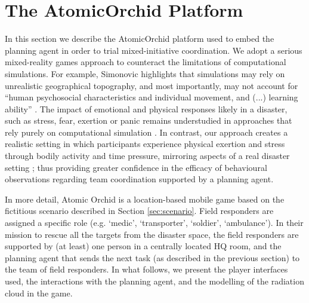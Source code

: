 \section{The A\lowercase{tomic}O\lowercase{rchid} Platform}\label{sec:atomicorchid}
\noindent In this section we describe the AtomicOrchid platform used to embed the planning agent in order to trial mixed-initiative coordination.
We adopt a serious mixed-reality games approach to counteract the limitations of computational simulations. For example, Simonovic highlights that simulations may rely on unrealistic geographical topography, and most importantly, may not account for ``human psychosocial characteristics and individual movement, and (...) learning ability'' \cite{simonovic:2009}. The impact of emotional and physical responses likely in a disaster, such as stress, fear, exertion or panic remains understudied in approaches that rely purely on computational simulation \cite{drury:etal:2009}. In contrast, our approach creates a realistic setting in which participants experience physical exertion and stress through bodily activity and time pressure, mirroring aspects of a real disaster setting \cite{paho:2001}; thus providing greater confidence in the efficacy of behavioural observations regarding team coordination supported by a planning agent.

In more detail, Atomic Orchid is a location-based mobile game based on the fictitious scenario described in Section \ref{sec:scenario}. Field responders are assigned a specific role (e.g. `medic', `transporter', `soldier', `ambulance'). In their mission to rescue all the targets from the disaster space, the field responders are supported by (at least) one person in a centrally located HQ room, and the planning agent that sends the next task (as described in the previous section) to the team of field responders. In what follows, we present the player interfaces used, the interactions with the planning agent, and the modelling of the radiation cloud in the game.





 